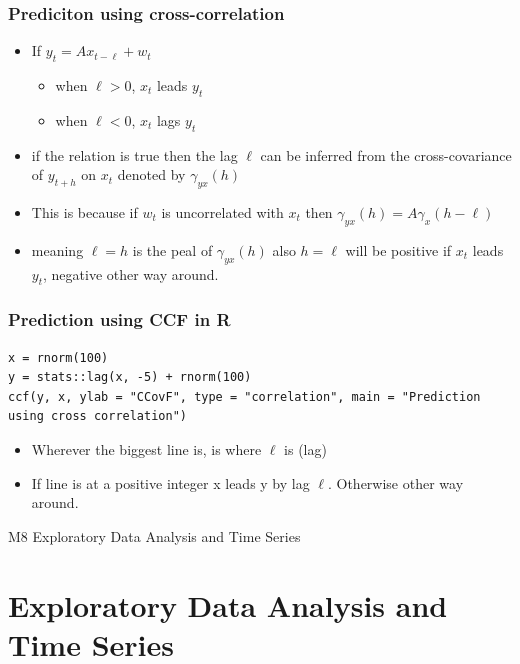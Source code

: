 \documentclass{article}
\begin{document}
\subsubsection{Prediciton using cross-correlation}

\begin{itemize}
    \item If $y_t = A x_{t - \ell} + w_t$
    \begin{itemize}
        \item when $\ell > 0$, $x_t$ leads $y_t$
        \item when $\ell < 0$, $x_t$ lags $y_t$
    \end{itemize}
    \item if the relation is true then the lag $\ell$ can be inferred from the cross-covariance of $y_{t+h}$ on $x_t$ denoted by $\gamma_{yx}(h)$
    \item This is because if $w_t$ is uncorrelated with $x_t$ then
    \subitem $\gamma_{yx}(h) = A \gamma_x (h - \ell)$
    \item meaning $\ell = h$ is the peal of $\gamma_{yx}(h)$ also $h = \ell$ will be positive if $x_t$ leads $y_t$, negative other way around.
\end{itemize}


\subsubsection{Prediction using CCF in R}
\begin{lstlisting}
x = rnorm(100)
y = stats::lag(x, -5) + rnorm(100)
ccf(y, x, ylab = "CCovF", type = "correlation", main = "Prediction using cross correlation")
\end{lstlisting}

\begin{itemize}
    \item Wherever the biggest line is, is where $\ell$ is (lag)
    \item If line is at a positive integer x leads y by lag $\ell$. Otherwise other way around.
\end{itemize}



\pagebreak

\begin{center}
    \Large{M8 Exploratory Data Analysis and Time Series}
\end{center}

\section{Exploratory Data Analysis and Time Series}
\end{document}
